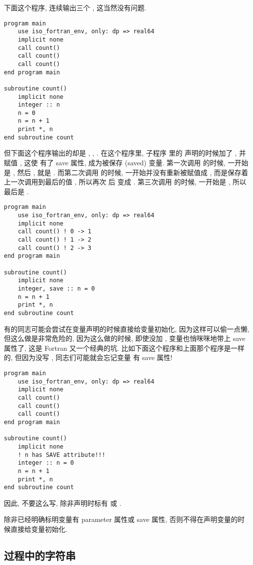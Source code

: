 下面这个程序, 连续输出三个 , 这当然没有问题. 
\begin{lstlisting} 
program main
    use iso_fortran_env, only: dp => real64
    implicit none
    call count()
    call count()
    call count()
end program main

subroutine count()
    implicit none
    integer :: n
    n = 0
    n = n + 1
    print *, n
end subroutine count
\end{lstlisting} 
但下面这个程序输出的却是 , , . 在这个程序里, 子程序  里的  声明的时候加了 , 并赋值 , 这使  有了 save 属性, 成为被保存 (saved) 变量. 第一次调用  的时候,  一开始是 , 然后 ,  就是 . 而第二次调用  的时候,  一开始并没有重新被赋值成 , 而是保存着上一次调用到最后的值 , 所以再次  后  变成 . 第三次调用  的时候,  一开始是 , 所以最后是 . 
\begin{lstlisting} 
program main
    use iso_fortran_env, only: dp => real64
    implicit none
    call count() ! 0 -> 1
    call count() ! 1 -> 2
    call count() ! 2 -> 3
end program main

subroutine count()
    implicit none
    integer, save :: n = 0
    n = n + 1
    print *, n
end subroutine count
\end{lstlisting} 
有的同志可能会尝试在变量声明的时候直接给变量初始化, 因为这样可以偷一点懒, 但这么做是非常危险的, 因为这么做的时候, 即使没加 , 变量也悄咪咪地带上 save 属性了, 这是 Fortran 又一个经典的坑. 比如下面这个程序和上面那个程序是一样的, 但因为没写 , 同志们可能就会忘记变量  有 save 属性!
\begin{lstlisting} 
program main
    use iso_fortran_env, only: dp => real64
    implicit none
    call count()
    call count()
    call count()
end program main

subroutine count()
    implicit none
    ! n has SAVE attribute!!!
    integer :: n = 0 
    n = n + 1
    print *, n
end subroutine count
\end{lstlisting} 
因此, 不要这么写, 除非声明时标有  或 . 
\begin{convention} 
    除非已经明确标明变量有 parameter 属性或 save 属性, 否则不得在声明变量的时候直接给变量初始化. 
\end{convention} 

\subsection{过程中的字符串} 


